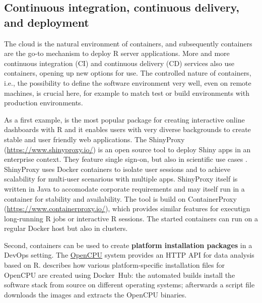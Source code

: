 \hypertarget{continuous-integration-continuous-delivery-and-deployment}{%
\subsection{Continuous integration, continuous delivery, and
deployment}\label{continuous-integration-continuous-delivery-and-deployment}}

\label{cicd} \label{deployment}

The cloud is the natural environment of containers, and subsequently
containers are the go-to mechanism to deploy R server applications. More
and more continuous integration (CI) and continuous delivery (CD)
services also use containers, opening up new options for use. The
controlled nature of containers, i.e., the possibility to define the
software environment very well, even on remote machines, is crucial
here, for example to match test or build environments with production
environments.

As a first example,  is the most popular package for
creating interactive online dashboards with R and it enables users with
very diverse backgrounds to create stable and user friendly web
applications. The ShinyProxy (\url{https://www.shinyproxy.io/}) is an
open source tool to deploy Shiny apps in an enterprise context. They
feature single sign-on, but also in scientific use cases
\citep[e.g., ][]{savini_epiexplorer_2019,glouzon_structurexplor_2017}.
ShinyProxy uses Docker containers to isolate user sessions and to
achieve scalability for multi-user scenarious with multiple apps.
ShinyProxy itself is written in Java to accomodate corporate
requirements and may itself run in a container for stability and
availability. The tool is build on ContainerProxy
(\url{https://www.containerproxy.io/}), which provides similar features
for executign long-running R jobs or interactive R sessions. The started
containers can run on a regular Docker host but also in clusters.

Second, containers can be used to create \textbf{platform installation
packages} in a DevOps setting. The
\href{https://www.opencpu.org/}{OpenCPU} system provides an HTTP API for
data analysis based on R. \citet{ooms_opencpu_2017} describes how
various platform-specific installation files for OpenCPU are created
using Docker~Hub: the automated builds install the software stack from
source on different operating systems; afterwards a script file
downloads the images and extracts the OpenCPU binaries.


